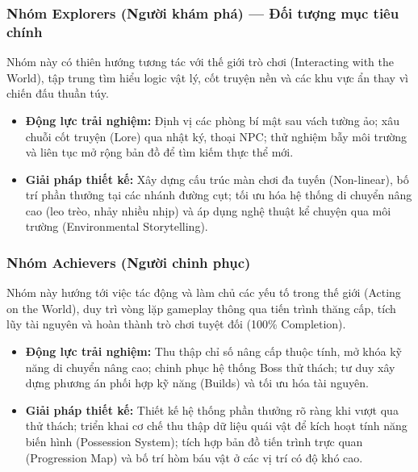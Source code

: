 \documentclass[../DoAn.tex]{subfiles}
\begin{document}
\subsubsection{Nhóm Explorers (Người khám phá) — Đối tượng mục tiêu chính}
Nhóm này có thiên hướng tương tác với thế giới trò chơi (Interacting with the World), tập trung tìm hiểu logic vật lý, cốt truyện nền và các khu vực ẩn thay vì chiến đấu thuần túy.
\begin{itemize}
    \item \textbf{Động lực trải nghiệm:} Định vị các phòng bí mật sau vách tường ảo; xâu chuỗi cốt truyện (Lore) qua nhật ký, thoại NPC; thử nghiệm bẫy môi trường và liên tục mở rộng bản đồ để tìm kiếm thực thể mới.
    \item \textbf{Giải pháp thiết kế:} Xây dựng cấu trúc màn chơi đa tuyến (Non-linear), bố trí phần thưởng tại các nhánh đường cụt; tối ưu hóa hệ thống di chuyển nâng cao (leo trèo, nhảy nhiều nhịp) và áp dụng nghệ thuật kể chuyện qua môi trường (Environmental Storytelling).
\end{itemize}

\subsubsection{Nhóm Achievers (Người chinh phục)}
Nhóm này hướng tới việc tác động và làm chủ các yếu tố trong thế giới (Acting on the World), duy trì vòng lặp gameplay thông qua tiến trình thăng cấp, tích lũy tài nguyên và hoàn thành trò chơi tuyệt đối (100\% Completion).
\begin{itemize}
    \item \textbf{Động lực trải nghiệm:} Thu thập chỉ số nâng cấp thuộc tính, mở khóa kỹ năng di chuyển nâng cao; chinh phục hệ thống Boss thử thách; tư duy xây dựng phương án phối hợp kỹ năng (Builds) và tối ưu hóa tài nguyên.
    \item \textbf{Giải pháp thiết kế:} Thiết kế hệ thống phần thưởng rõ ràng khi vượt qua thử thách; triển khai cơ chế thu thập dữ liệu quái vật để kích hoạt tính năng biến hình (Possession System); tích hợp bản đồ tiến trình trực quan (Progression Map) và bố trí hòm báu vật ở các vị trí có độ khó cao.
\end{itemize}
\end{document}
